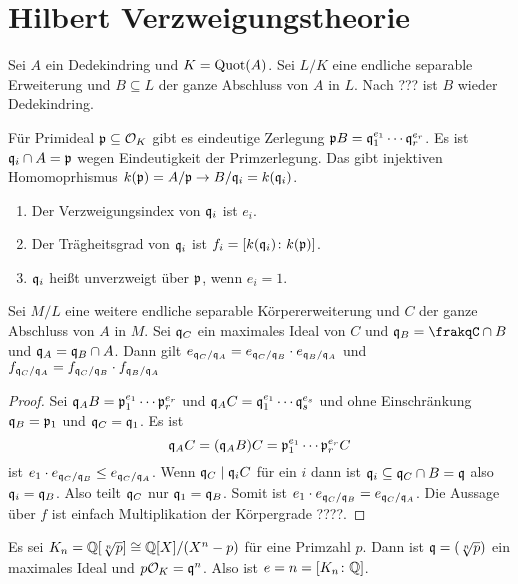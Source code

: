 \chapter{Hilbert Verzweigungstheorie}
Sei \(A\) ein Dedekindring und \(K=\operatorname{Quot}(A)\). Sei \(L/K\) eine endliche separable Erweiterung und \(B\subseteq L\) der ganze Abschluss von \(A\) in \(L\). Nach ??? ist \(B\) wieder Dedekindring.

\begin{Def}Für Primideal \(\mathfrak{p}\subseteq \mathcal{O}_K\) gibt es eindeutige Zerlegung 
	\(\mathfrak{p} B=\mathfrak{q}_1^{e_1}\cdots \mathfrak{q}_r^{e_r}\).
	Es ist \(\mathfrak{q}_i\cap A=\mathfrak{p}\) wegen Eindeutigkeit der Primzerlegung.
	Das gibt injektiven Homomoprhismus \(k(\mathfrak{p})=A/\mathfrak{p}\to B/\mathfrak{q}_i=k(\mathfrak{q}_i)\).
	\begin{enumerate}
		\item 
		Der Verzweigungsindex von \(\mathfrak{q}_i\) ist \(e_i\).
		\item Der Trägheitsgrad von \(\mathfrak{q}_i\) ist \(f_i=[k(\mathfrak{q}_i)\colon k(\mathfrak{p})]\).
		\item \(\mathfrak{q}_i\) heißt unverzweigt über \(\mathfrak{p}\), wenn \(e_i=1\).
	\end{enumerate}
	
\end{Def}
\begin{Lemma}
	Sei \(M/L\) eine weitere endliche separable Körpererweiterung und \(C\) der ganze Abschluss von \(A\) in \(M\). Sei \(\mathfrak{q}_C\) ein maximales Ideal von \(C\)
	und \(\frakq_B=\frakqC\cap B\) und \(\mathfrak{q}_A=\mathfrak{q}_B\cap A\).
	Dann gilt 
	\(e_{\mathfrak{q}_C/\mathfrak{q}_A}=e_{\mathfrak{q}_C/\mathfrak{q}_B}\cdot e_{\mathfrak{q}_B/\mathfrak{q}_A}\) und \(f_{\mathfrak{q}_C/\mathfrak{q}_A}=f_{\mathfrak{q}_C/\mathfrak{q}_B}\cdot f_{\mathfrak{q}_B/\mathfrak{q}_A}\)
\end{Lemma}
\begin{proof}
	Sei \(\mathfrak{q}_AB=\mathfrak{p}_1^{e_1}\cdots \mathfrak{p}_r^{e_r}\)
	und \(\mathfrak{q}_AC=\mathfrak{q}_1^{e_1}\cdots \mathfrak{q}_s^{e_s}\)
	und ohne Einschränkung \(\mathfrak{q}_B=\mathfrak{p}_1\) und \(\mathfrak{q}_C=\mathfrak{q}_1\).
	Es ist
	\[\mathfrak{q}_AC=(\mathfrak{q}_AB)C=\mathfrak{p}_1^{e_1}\cdots \mathfrak{p}_r^{e_r}C\] ist \(e_1\cdot e_{\mathfrak{q}_C/\mathfrak{q}_B}\leq e_{\mathfrak{q}_C/\mathfrak{q}_A}\).
	Wenn \(\mathfrak{q}_C\mid \mathfrak{q}_iC\) für ein \(i\) dann ist
	\(\mathfrak{q}_i\subseteq \mathfrak{q}_C\cap B=\mathfrak{q}\) also \(\mathfrak{q}_i=\mathfrak{q}_B\).
	Also teilt \(\mathfrak{q}_C\) nur \(\mathfrak{q}_1=\mathfrak{q}_B\).
	Somit ist \(e_1\cdot e_{\mathfrak{q}_C/\mathfrak{q}_B}= e_{\mathfrak{q}_C/\mathfrak{q}_A}\).
	Die Aussage über \(f\) ist einfach Multiplikation der Körpergrade ????.
\end{proof}
\begin{Bsp}
	Es sei \(K_n=\mathbb{Q}[\sqrt[n]{p}]\cong \mathbb{Q}[X]/(X^n-p)\) für eine Primzahl \(p\). Dann ist \(\mathfrak{q}=(\sqrt[n]{p})\) ein maximales Ideal und 
	\(p\mathcal{O}_K=\mathfrak{q}^n\). Also ist \(e=n=[K_n\colon \mathbb{Q}]\).
	
\end{Bsp}
